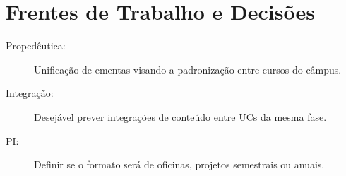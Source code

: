 \documentclass[a4paper,12pt]{article}
\begin{document}
\section{Frentes de Trabalho e Decisões}
\begin{description}
    \item[Propedêutica:] Unificação de ementas visando a padronização entre cursos do câmpus.
    \item[Integração:] Desejável prever integrações de conteúdo entre UCs da mesma fase.
    \item[PI:] Definir se o formato será de oficinas, projetos semestrais ou anuais.
\end{description}
\end{document}
